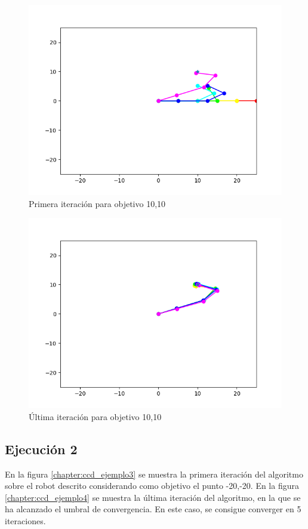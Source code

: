\begin{figure}[htb]
   \centering
   \includegraphics[width=.8\linewidth]{images/ccd_5.png}
   \caption{Primera iteración para objetivo 10,10}
   \label{chapter:ccd_ejemplo1}
\end{figure}
\begin{figure}[htb]
   \centering
   \includegraphics[width=.8\linewidth]{images/ccd_6.png}
   \caption{Última iteración para objetivo 10,10}
   \label{chapter:ccd_ejemplo2}
\end{figure}

\subsection{Ejecución 2}
En la figura \ref{chapter:ccd_ejemplo3} se muestra la primera iteración del algoritmo sobre el robot descrito considerando como objetivo el punto -20,-20.
En la figura \ref{chapter:ccd_ejemplo4} se muestra la última iteración del algoritmo, en la que se ha alcanzado el umbral de convergencia. En este caso, se consigue converger en 5 iteraciones.

